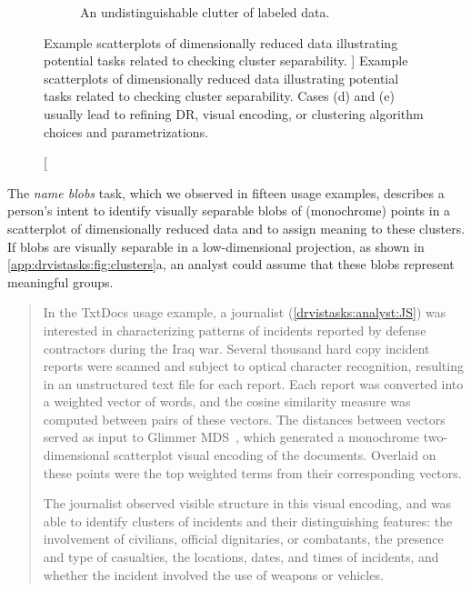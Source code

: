 \begin{figure}
\begin{subfigure}[t]{0.45\textwidth}
        \caption{An undistinguishable clutter of labeled data.}
    \end{subfigure}
	\caption
	[
	    Example scatterplots of dimensionally reduced data illustrating potential tasks related to checking cluster separability.
	]
	{
    	Example scatterplots of dimensionally reduced data illustrating potential tasks related to checking cluster separability. Cases (d) and (e) usually lead to refining \ac{DR}, visual encoding, or clustering algorithm choices and parametrizations.
	}
	\centering
	\label{app:drvistasks:fig:clusters}
\end{figure}


The {\it name blobs} task, which we observed in fifteen usage examples, describes a person's intent to identify visually separable blobs of (monochrome) points in a scatterplot of dimensionally reduced data and to assign meaning to these clusters. 
If blobs are visually separable in a low-dimensional projection, as shown in \autoref{app:drvistasks:fig:clusters}a, an analyst could assume that these blobs represent meaningful groups. 

\begin{quotation}
    In the {\sc TxtDocs} usage example, a journalist (\ref{drvistasks:analyst:JS}) was interested in characterizing patterns of incidents reported by defense contractors during the Iraq war.
    Several thousand hard copy incident reports were scanned and subject to optical character recognition, resulting in an unstructured text file for each report.
    Each report was converted into a weighted vector of words, and the cosine similarity measure was computed between pairs of these vectors.
    The distances between vectors served as input to Glimmer \ac{MDS}~\cite{Ingram2009}, which generated a monochrome two-dimensional scatterplot visual encoding of the documents. 
    Overlaid on these points were the top weighted terms from their corresponding vectors.  
    
    The journalist observed visible structure in this visual encoding, and was able to identify clusters of incidents and their distinguishing features: the involvement of civilians, official dignitaries, or combatants, the presence and type of casualties, the locations, dates, and times of incidents, and whether the incident involved the use of weapons or vehicles.
\end{quotation}

